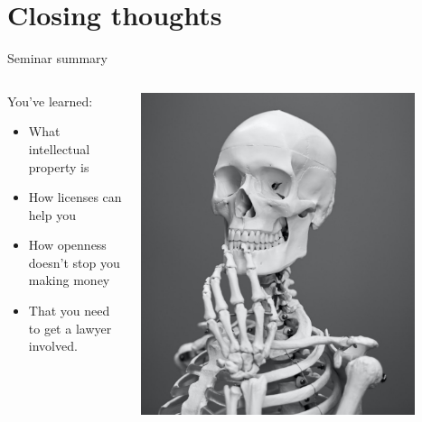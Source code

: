 \section[Closing]{Closing thoughts}
\label{sec:closing}

\begin{frame}{Seminar summary}

	\begin{columns}[c]
		\begin{column}{.45\textwidth}
		    You've learned:
		    \begin{itemize}
			    \item What intellectual property is
			    \item How licenses can help you 
			    \item How openness doesn't stop you making money
			    \item That you need to get a lawyer involved.
		    \end{itemize}
		\end{column}

		\begin{column}{.45\textwidth}
		
		    \includegraphics[width=0.85\textwidth]{images/mathew-schwartz-8rj4sz9YLCI-unsplash-crop.jpg}
		    
		\end{column}
		
	\end{columns}

\end{frame}

